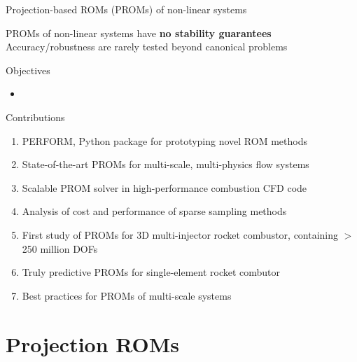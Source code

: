 \documentclass[]{beamer}
\begin{document}
\begin{frame}{Projection-based ROMs (PROMs) of non-linear systems}
\begin{minipage}{0.49\linewidth}
\begin{figure}
		\end{figure}
	\end{minipage}
	\begin{tcolorbox}[colframe=blue!50!white,halign=center]
		PROMs of non-linear systems have \textbf{no stability guarantees} \\
		Accuracy/robustness are rarely tested beyond canonical problems
	\end{tcolorbox}
\end{frame}

\begin{frame}{Objectives}
	\begin{itemize}
		\item 
	\end{itemize}
\end{frame}

\begin{frame}{Contributions}
    \begin{enumerate}
		\item PERFORM, Python package for prototyping novel ROM methods
        \item State-of-the-art PROMs for multi-scale, multi-physics flow systems
        \item Scalable PROM solver in high-performance combustion CFD code
        \item Analysis of cost and performance of sparse sampling methods
        \item First study of PROMs for 3D multi-injector rocket combustor, containing $>$ 250 million DOFs
        \item Truly predictive PROMs for single-element rocket combutor
        \item Best practices for PROMs of multi-scale systems
    \end{enumerate}
\end{frame}

\section*{Projection ROMs}
\end{document}
